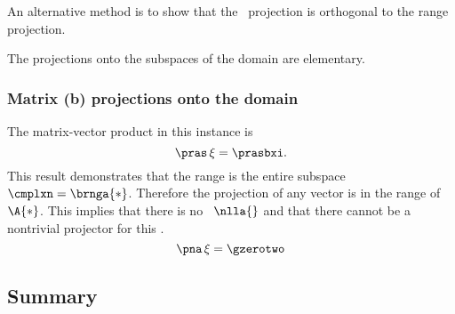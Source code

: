 An alternative method is to show that the \ns \ projection is orthogonal to the range projection.

The projections onto the subspaces of the domain are elementary.

\subsubsection{Matrix (b) projections onto the domain}
The matrix-vector product in this instance is
\begin{equation}
  \pras \,  \xi= \prasbxi.
\end{equation}
This result demonstrates that the range is the entire subspace $\cmplxn = \brnga{*}$. Therefore the projection of any vector is in the range of $\A{*}$. This implies that there is no \ns \ $\nlla{}$ and that there cannot be a nontrivial projector for this \ns.
\begin{equation}
  \pna \,   \xi = \gzerotwo
\end{equation}


\subsection{Summary}



\endinput
